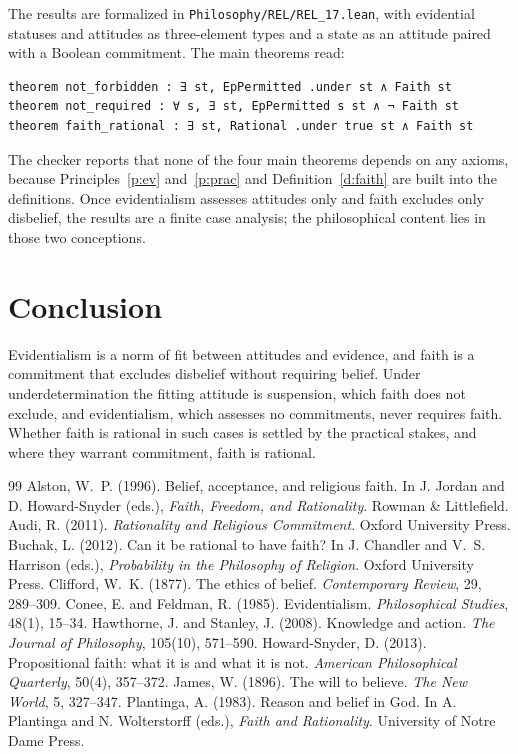 \documentclass{situationist-preprint}
\begin{document}
The results are formalized in \nolinkurl{Philosophy/REL/REL_17.lean}, with evidential statuses and attitudes as three-element types and a state as an attitude paired with a Boolean commitment. The main theorems read:

\begin{lstlisting}
theorem not_forbidden : ∃ st, EpPermitted .under st ∧ Faith st
theorem not_required : ∀ s, ∃ st, EpPermitted s st ∧ ¬ Faith st
theorem faith_rational : ∃ st, Rational .under true st ∧ Faith st
\end{lstlisting}

The checker reports that none of the four main theorems depends on any axioms, because Principles~\ref{p:ev} and~\ref{p:prac} and Definition~\ref{d:faith} are built into the definitions. Once evidentialism assesses attitudes only and faith excludes only disbelief, the results are a finite case analysis; the philosophical content lies in those two conceptions.

\section{Conclusion}

Evidentialism is a norm of fit between attitudes and evidence, and faith is a commitment that excludes disbelief without requiring belief. Under underdetermination the fitting attitude is suspension, which faith does not exclude, and evidentialism, which assesses no commitments, never requires faith. Whether faith is rational in such cases is settled by the practical stakes, and where they warrant commitment, faith is rational.

\begin{thebibliography}{99}\small
{} Alston, W.~P. (1996). Belief, acceptance, and religious faith. In J. Jordan and D. Howard-Snyder (eds.), \emph{Faith, Freedom, and Rationality}. Rowman \& Littlefield.
 Audi, R. (2011). \emph{Rationality and Religious Commitment}. Oxford University Press.
 Buchak, L. (2012). Can it be rational to have faith? In J. Chandler and V.~S. Harrison (eds.), \emph{Probability in the Philosophy of Religion}. Oxford University Press.
 Clifford, W.~K. (1877). The ethics of belief. \emph{Contemporary Review}, 29, 289--309.
 Conee, E. and Feldman, R. (1985). Evidentialism. \emph{Philosophical Studies}, 48(1), 15--34.
 Hawthorne, J. and Stanley, J. (2008). Knowledge and action. \emph{The Journal of Philosophy}, 105(10), 571--590.
 Howard-Snyder, D. (2013). Propositional faith: what it is and what it is not. \emph{American Philosophical Quarterly}, 50(4), 357--372.
 James, W. (1896). The will to believe. \emph{The New World}, 5, 327--347.
 Plantinga, A. (1983). Reason and belief in God. In A. Plantinga and N. Wolterstorff (eds.), \emph{Faith and Rationality}. University of Notre Dame Press.
\end{thebibliography}
\end{document}
